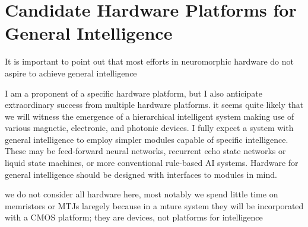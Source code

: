 \section{\label{sec:hardware}Candidate Hardware Platforms for General Intelligence}

\vspace{3em}
It is important to point out that most efforts in neuromorphic hardware do not aspire to achieve general intelligence

\vspace{3em}
I am a proponent of a specific hardware platform, but I also anticipate extraordinary success from multiple hardware platforms. it seems quite likely that we will witness the emergence of a hierarchical intelligent system making use of various magnetic, electronic, and photonic devices. I fully expect a system with general intelligence to employ simpler modules capable of specific intelligence. These may be feed-forward neural networks, recurrent echo state networks or liquid state machines, or more conventional rule-based AI systems. Hardware for general intelligence should be designed with interfaces to modules in mind.

\vspace{3em}
we do not consider all hardware here, most notably we spend little time on memristors or MTJs laregely because in a mture system they will be incorporated with a CMOS platform; they are devices, not platforms for intelligence

\vspace{3em}














